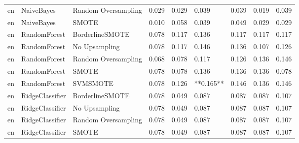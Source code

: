 \begin{tabular}{lllllllll}
      en &                   NaiveBayes & Random Oversampling & 0.029 &                     0.029 &                 0.039 &                  0.039 &                                   0.019 &     0.039 \\
      en &                   NaiveBayes &               SMOTE & 0.010 &                     0.058 &                 0.039 &                  0.049 &                                   0.029 &     0.029 \\
      en &                 RandomForest &     BorderlineSMOTE & 0.078 &                     0.117 &                 0.136 &                  0.117 &                                   0.117 &     0.117 \\
      en &                 RandomForest &       No Upsampling & 0.078 &                     0.117 &                 0.146 &                  0.136 &                                   0.107 &     0.126 \\
      en &                 RandomForest & Random Oversampling & 0.068 &                     0.078 &                 0.117 &                  0.126 &                                   0.136 &     0.146 \\
      en &                 RandomForest &               SMOTE & 0.078 &                     0.078 &                 0.136 &                  0.136 &                                   0.136 &     0.078 \\
      en &                 RandomForest &            SVMSMOTE & 0.078 &                     0.126 &             **0.165** &                  0.146 &                                   0.136 &     0.146 \\
      en &              RidgeClassifier &     BorderlineSMOTE & 0.078 &                     0.049 &                 0.087 &                  0.087 &                                   0.087 &     0.107 \\
      en &              RidgeClassifier &       No Upsampling & 0.078 &                     0.049 &                 0.087 &                  0.087 &                                   0.087 &     0.107 \\
      en &              RidgeClassifier & Random Oversampling & 0.078 &                     0.049 &                 0.087 &                  0.087 &                                   0.087 &     0.107 \\
      en &              RidgeClassifier &               SMOTE & 0.078 &                     0.049 &                 0.087 &                  0.087 &                                   0.087 &     0.107 \\

\end{tabular}

